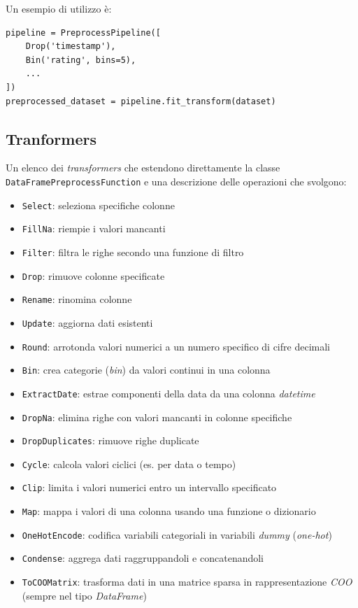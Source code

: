 Un esempio di utilizzo è:

\begin{lstlisting}[caption=esempio di utilizzo di \texttt{PreprocessPipeline}]
pipeline = PreprocessPipeline([
    Drop('timestamp'),
    Bin('rating', bins=5),
    ...
])
preprocessed_dataset = pipeline.fit_transform(dataset) 
\end{lstlisting}

\subsection{Tranformers}

Un elenco dei \textit{transformers} che estendono direttamente la classe \\
\texttt{DataFramePreprocessFunction} e una descrizione delle operazioni che svolgono:

\begin{itemize}
    \item \texttt{Select}: seleziona specifiche colonne
    \item \texttt{FillNa}: riempie i valori mancanti
    \item \texttt{Filter}: filtra le righe secondo una funzione di filtro
    \item \texttt{Drop}: rimuove colonne specificate
    \item \texttt{Rename}: rinomina colonne
    \item \texttt{Update}: aggiorna dati esistenti
    \item \texttt{Round}: arrotonda valori numerici a un numero specifico di cifre decimali
    \item \texttt{Bin}: crea categorie (\textit{bin}) da valori continui in una colonna
    \item \texttt{ExtractDate}: estrae componenti della data da una colonna \textit{datetime}
    \item \texttt{DropNa}: elimina righe con valori mancanti in colonne specifiche
    \item \texttt{DropDuplicates}: rimuove righe duplicate
    \item \texttt{Cycle}: calcola valori ciclici (es. per data o tempo)
    \item \texttt{Clip}: limita i valori numerici entro un intervallo specificato
    \item \texttt{Map}: mappa i valori di una colonna usando una funzione o dizionario
    \item \texttt{OneHotEncode}: codifica variabili categoriali in variabili \textit{dummy} (\textit{one-hot})
    \item \texttt{Condense}: aggrega dati raggruppandoli e concatenandoli
    \item \texttt{ToCOOMatrix}: trasforma dati in una matrice sparsa in rappresentazione \textit{COO} (sempre nel tipo \textit{DataFrame})
\end{itemize}

